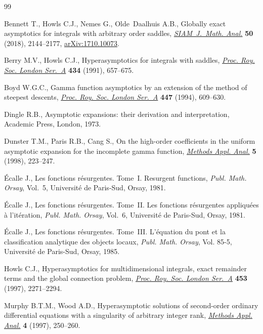 \documentclass[pdftex]{sigma}
\numberwithin{equation}{section}
\begin{document}
\begin{thebibliography}{99}
\footnotesize\itemsep=0pt

Bennett T., Howls C.J., Nemes G., Olde~Daalhuis A.B., Globally exact
 asymptotics for integrals with arbitrary order saddles, \href{https://doi.org/10.1137/17M1154217}{\textit{SIAM~J.~Math.
 Anal.}} \textbf{50} (2018), 2144--2177, \href{https://arxiv.org/abs/1710.10073}{arXiv:1710.10073}.

Berry M.V., Howls C.J., Hyperasymptotics for integrals with saddles,
  \href{https://doi.org/10.1098/rspa.1991.0119}{\textit{Proc. Roy. Soc. London Ser.~A}} \textbf{434} (1991), 657--675.

Boyd W.G.C., Gamma function asymptotics by an extension of the method of
 steepest descents, \href{https://doi.org/10.1098/rspa.1994.0158}{\textit{Proc. Roy. Soc. London Ser.~A}} \textbf{447}
 (1994), 609--630.

Dingle R.B., Asymptotic expansions: their derivation and interpretation,
 Academic Press, London, 1973.

Dunster T.M., Paris R.B., Cang S., On the high-order coefficients in the
 uniform asymptotic expansion for the incomplete gamma function,
  \href{https://doi.org/10.4310/MAA.1998.v5.n3.a1}{\textit{Methods Appl. Anal.}} \textbf{5} (1998), 223--247.

\'Ecalle J., Les fonctions r\'esurgentes. {T}ome~{I}. {R}esurgent functions,
 \textit{Publ. Math. Orsay}, Vol.~5, Universit\'e de Paris-Sud, Orsay, 1981.

\'Ecalle J., Les fonctions r\'esurgentes. {T}ome~{II}. {L}es fonctions
 r\'esurgentes appliqu\'ees \`a l'it\'eration, \textit{Publ. Math. Orsay},
 Vol.~6, Universit\'e de Paris-Sud, Orsay, 1981.

\'Ecalle J., Les fonctions r\'esurgentes. {T}ome~{III}. {L}'\'equation du pont
 et la classification analytique des objects locaux, \textit{Publ. Math.
 Orsay}, Vol. 85-5, Universit\'e de Paris-Sud, Orsay, 1985.

Howls C.J., Hyperasymptotics for multidimensional integrals, exact remainder
 terms and the global connection problem, \href{https://doi.org/10.1098/rspa.1997.0122}{\textit{Proc. Roy. Soc. London
 Ser.~A}} \textbf{453} (1997), 2271--2294.

Murphy B.T.M., Wood A.D., Hyperasymptotic solutions of second-order ordinary
 differential equations with a singularity of arbitrary integer rank,
 \href{https://doi.org/10.4310/MAA.1997.v4.n3.a2}{\textit{Methods Appl. Anal.}} \textbf{4} (1997), 250--260.


\end{thebibliography}
\end{document}
